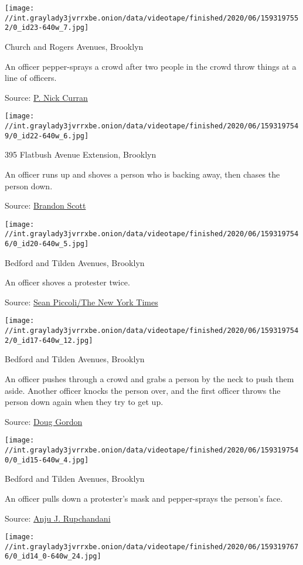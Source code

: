 \texttt{[image: //int.graylady3jvrrxbe.onion/data/videotape/finished/2020/06/1593197552/0\_id23-640w\_7.jpg]}

 Church and Rogers Avenues, Brooklyn

 An officer pepper-sprays a crowd after two people in the crowd throw
things at a line of officers.

Source:
\href{https://twitter.com/PNickCurran/status/1266959923641974784?s=20}{P.
Nick Curran}

\texttt{[image: //int.graylady3jvrrxbe.onion/data/videotape/finished/2020/06/1593197549/0\_id22-640w\_6.jpg]}

 395 Flatbush Avenue Extension, Brooklyn

 An officer runs up and shoves a person who is backing away, then chases
the person down.

Source:
\href{https://twitter.com/brandon212_/status/1267184037547986944}{Brandon
Scott}

\texttt{[image: //int.graylady3jvrrxbe.onion/data/videotape/finished/2020/06/1593197546/0\_id20-640w\_5.jpg]}

 Bedford and Tilden Avenues, Brooklyn

 An officer shoves a protester twice.

Source:
\href{https://twitter.com/spiccoli/status/1266861960982913030}{Sean
Piccoli/The New York Times}

\texttt{[image: //int.graylady3jvrrxbe.onion/data/videotape/finished/2020/06/1593197542/0\_id17-640w\_12.jpg]}

 Bedford and Tilden Avenues, Brooklyn

 An officer pushes through a crowd and grabs a person by the neck to
push them aside. Another officer knocks the person over, and the first
officer throws the person down again when they try to get up.

Source:
\href{https://twitter.com/BrooklynSpoke/status/1266845497446318081}{Doug
Gordon}

\texttt{[image: //int.graylady3jvrrxbe.onion/data/videotape/finished/2020/06/1593197540/0\_id15-640w\_4.jpg]}

 Bedford and Tilden Avenues, Brooklyn

 An officer pulls down a protester's mask and pepper-sprays the person's
face.

Source:
\href{https://twitter.com/AJRupchandani/status/1266889115288711168}{Anju
J. Rupchandani}

\texttt{[image: //int.graylady3jvrrxbe.onion/data/videotape/finished/2020/06/1593197676/0\_id14\_0-640w\_24.jpg]}

